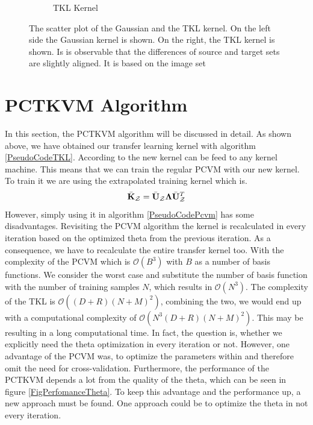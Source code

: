 \begin{figure}
\begin{subfigure}{.5\textwidth}
		\caption{\acs{TKL} Kernel\label{FigTKLKernel}}
	\end{subfigure}
	\caption[Scatter Plot of TKL and Gaussian Kernel]{The scatter plot of the Gaussian and the \acs{TKL} kernel. On the left side the Gaussian kernel is shown. On the right, the \acs{TKL} kernel is shown. Is is observable that the differences of source and target sets are slightly aligned. It is based on the image set\label{FigKernelComparison}}
\end{figure}
\section{PCTKVM Algorithm}\label{InSecAlgo}
In this section, the \acl{PCTKVM} algorithm will be discussed in detail.
As shown above, we have obtained our transfer learning kernel with algorithm \ref{PseudoCodeTKL}.
According to \cite{Long.2015} the new kernel can be feed to any kernel machine.
This means that we can train the regular \acf{PCVM} with our new kernel.
To train it we are using the extrapolated training kernel which is.
\begin{equation}
	\bar{\mathbf{K}}_\mathcal{Z} = \bar{\mathbf{U}}_\mathcal{Z}\mathbf{\Lambda}\bar{\mathbf{U}}_\mathcal{Z}^T
\end{equation}
However, simply using it in algorithm \ref{PseudoCodePcvm} has some disadvantages.
Revisiting the \acs{PCVM} algorithm the kernel is recalculated in every iteration based on the optimized theta from the previous iteration.
As a consequence, we have to recalculate the entire transfer kernel too.
With the complexity of the \acs{PCVM} which is $\mathcal{O}(B^3)$ with $B$ as a number of basis functions.
We consider the worst case and substitute the number of basis function with the number of training samples $N$, which results in $\mathcal{O}(N^3)$.
The complexity of the \acs{TKL} is $\mathcal{O}((D+R)(N+M)^2)$, combining the two, we would end up with a computational complexity of $\mathcal{O}(N^3(D+R)(N+M)^2)$.
This may be resulting in a long computational time.
In fact, the question is, whether we explicitly need the theta optimization in every iteration or not.
However, one advantage of the \acs{PCVM} was, to optimize the parameters within and therefore omit the need for cross-validation.
Furthermore, the performance of the \acs{PCTKVM} depends a lot from the quality of the theta, which can be seen in figure \ref{FigPerfomanceTheta}.
To keep this advantage and the performance up, a new approach must be found.
One approach could be to optimize the theta in not every iteration.
